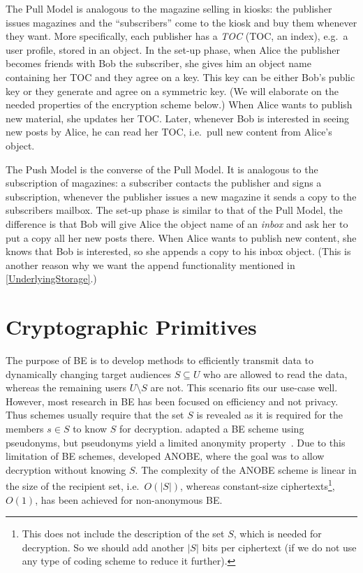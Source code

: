 The Pull Model is analogous to the magazine selling in kiosks:
the publisher issues magazines and the \enquote{subscribers} come to the kiosk 
and buy them whenever they want.
More specifically, each publisher has a \emph{\acl{TOC}} (\acs{TOC}, an index), 
e.g.\ a user profile, stored in an object.
In the set-up phase, when Alice the publisher becomes friends with Bob the 
subscriber, she gives him an object name containing her \ac{TOC} and they agree 
on a key.
This key can be either Bob's public key or they generate and agree on 
a symmetric key.
(We will elaborate on the needed properties of the encryption scheme below.)
When Alice wants to publish new material, she updates her \ac{TOC}.
Later, whenever Bob is interested in seeing new posts by Alice, he can read her 
\ac{TOC}, i.e.\ pull new content from Alice's object.

The Push Model is the converse of the Pull Model.
It is analogous to the subscription of magazines:
a subscriber contacts the publisher and signs a subscription, whenever the 
publisher issues a new magazine it sends a copy to the subscribers mailbox.
The set-up phase is similar to that of the Pull Model, the difference is that 
Bob will give Alice the object name of an \emph{inbox} and ask her to put 
a copy all her new posts there.
When Alice wants to publish new content, she knows that Bob is interested, so 
she appends a copy to his inbox object.
(This is another reason why we want the append functionality mentioned in 
\cref{UnderlyingStorage}.)


\section<article>{Cryptographic Primitives}\label{BE}\label{Prerequisites}

The purpose of \ac{BE} is to develop methods to efficiently transmit data to 
dynamically changing target audiences \(S\subseteq U\) who are allowed to read 
the data, whereas the remaining users \(U\setminus S\) are not.
This scenario fits our use-case well.
However, most research in \ac{BE} has been focused on efficiency and not 
privacy.
Thus schemes usually require that the set \(S\) is revealed as it is required 
for the members \(s\in S\) to know \(S\) for decryption.
\citet{PseudonymousBE} adapted a \ac{BE} scheme using pseudonyms, but 
pseudonyms yield a limited anonymity property~\cite{PseudonymousBE}.
Due to this limitation of \ac{BE} schemes, \citet{ANOBE} developed \ac{ANOBE}, 
where the goal was to allow decryption without knowing \(S\).
The complexity of the \ac{ANOBE} scheme is linear in the size of the recipient 
set, i.e.~\(O(|S|)\), whereas constant-size ciphertexts\footnote{%
  This does not include the description of the set \(S\), which is needed for 
  decryption.
  So we should add another \(|S|\) bits per ciphertext (if we do not use any 
  type of coding scheme to reduce it further).
}, \(O(1)\), has been achieved for non-anonymous \ac{BE}.

